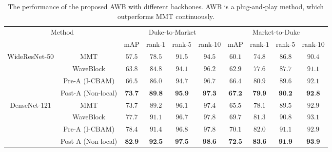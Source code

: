 \documentclass[journal]{IEEEtran}
\begin{document}
\begin{table*}
\centering
\caption{The performance of the proposed AWB with different backbones. AWB is a plug-and-play method, which outperforms MMT \cite{ge2020mutual} continuously.} 
  \begin{tabular}{|*{10}{c|}}
  \hline
    \multicolumn{2}{|c|}{\multirow{2}{*}{Method}}  & \multicolumn{4}{c|}{Duke-to-Market} & \multicolumn{4}{c|}{Market-to-Duke}\\\cline{3-10}
    \multicolumn{2}{|c|}{}   & mAP & rank-$1$ & rank-$5$ & rank-$10$ & mAP & rank-$1$ & rank-$5$ & rank-$10$ \\\hline
    \multirow{4}{*}{WideResNet-50 \cite{zagoruyko2016wide}} & MMT \cite{ge2020mutual} & $57.5$ & $78.5$ & $91.5$ & $94.5$ & $60.1$ & $74.8 $ & $ 86.8$ & $ 90.4$ \\\cline{2-2}
        & WaveBlock & $63.8$ &$84.8$ & $94.1$ & $96.2$ & $62.9$ & $77.6$ & $87.7$ & $91.1$ \\\cline{2-2}
        & Pre-A (I-CBAM) & $66.5$ &$86.0$ & $94.7$ & $96.7$ & $66.4$ & $80.9$ & $89.6$ & $92.1$ \\\cline{2-2}
        & Post-A (Non-local) & $\textbf{73.7}$ & $\textbf{89.8}$ & $\textbf{95.9}$ & $\textbf{97.3}$ & $\textbf{67.2}$ & $\textbf{79.9}$ & $\textbf{90.2}$ & $\textbf{92.8}$ \\\hline
    \multirow{4}{*}{DenseNet-121 \cite{huang2017densely}} & MMT \cite{ge2020mutual} & $73.7$ & $89.2$ & $96.1$ & $97.4$ & $65.5$ & $78.1$ & $ 89.5$ & $92.9$ \\\cline{2-2}
        & WaveBlock & $77.7$ & $91.1$ & $96.7$ & $97.8$ & $69.7$ & $ 81.3$ & $90.8$ & $ 93.1$ \\\cline{2-2}
        & Pre-A (I-CBAM) & $78.4$ & $91.4$ & $96.8$ & $97.8$ & $70.1$ & $82.0$ & $91.1$ & $92.9$ \\\cline{2-2}
        & Post-A (Non-local) & $\textbf{82.9}$ & $\textbf{92.5}$ & $\textbf{97.5}$ & $\textbf{98.6}$ & $\textbf{72.5}$ & $\textbf{83.6}$ & $\textbf{91.9}$ & $\textbf{93.9}$ \\\hline
  \end{tabular}
\label{backbone}
\end{table*}
\end{document}
